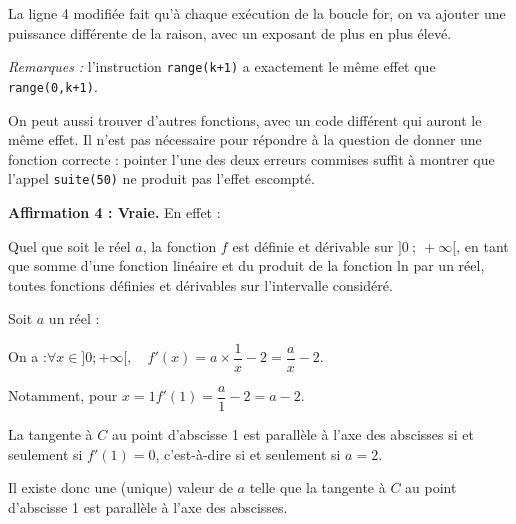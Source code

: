 La ligne 4 modifiée fait qu'à chaque exécution de la boucle for, on va ajouter une puissance différente de la raison, avec un exposant de plus en plus élevé.

\emph{Remarques :} l'instruction \texttt{range(k+1)} a exactement le même effet que \texttt{range(0,k+1)}.

On peut aussi trouver d'autres fonctions, avec un code différent qui auront le même effet. Il n'est pas nécessaire pour répondre à la question de donner une fonction correcte : pointer l'une des deux erreurs commises suffit à montrer que l'appel \texttt{suite(50)} ne produit pas l'effet escompté.

\medskip

\textbf{Affirmation 4 : Vraie.} \quad En effet :

Quel que soit le réel $a$, la fonction $f$ est définie et dérivable sur $]0~;~+\infty[ $, en tant que somme d'une fonction linéaire et du produit de la fonction ln par un réel, toutes fonctions définies et dérivables sur l'intervalle considéré.

Soit $a$ un réel :

On a :\quad $\forall x \in ]0 ; +\infty[, \quad f'(x) = a\times \dfrac{1}{x} - 2 = \dfrac{a}{x} - 2$.

Notamment, pour $x = 1 $\quad $f'(1) = \dfrac{a}{1} - 2 = a-2$.

La tangente à $C$ au point d'abscisse 1 est parallèle à l'axe des abscisses si et seulement si $f'(1) = 0$, c'est-à-dire si et seulement si $a = 2$.

Il existe donc une (unique) valeur de $a$ telle que la tangente à $C$ au point d'abscisse 1 est parallèle à l'axe des abscisses.
